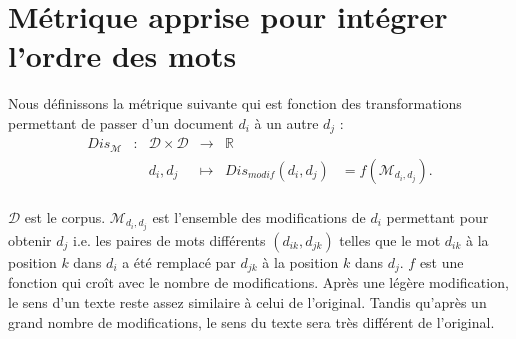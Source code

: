 \section{Métrique apprise pour intégrer l'ordre des mots}
Nous définissons la métrique suivante qui est fonction des transformations permettant de passer d'un document $d_i$ à un autre $d_j$ :
\begin{equation}
\begin{array}{cccccc}
Dis_\mathcal{M} & : & \mathcal{D} \times \mathcal{D} & \to & \mathbb{R} & \\
& & d_i, d_j & \mapsto & Dis_{modif}(d_i, d_j) & = f(\mathcal{M}_{d_i, d_j}). \\
\end{array} \label{eq:similarite:taux-modif}
\end{equation}

$\mathcal{D}$ est le corpus. $\mathcal{M}_{d_i, d_j}$ est l'ensemble des modifications de $d_i$ permettant pour obtenir $d_j$ i.e. les paires de mots différents $(d_{ik}, d_{jk})$ telles que le mot $d_{ik}$ à la position $k$ dans $d_i$ a été remplacé par $d_{jk}$ à la position $k$ dans $d_j$. $f$ est une fonction qui croît avec le nombre de modifications. Après une légère modification, le sens d'un texte reste assez similaire à celui de l'original. Tandis qu'après un grand nombre de modifications, le sens du texte sera très différent de l'original. %

%

